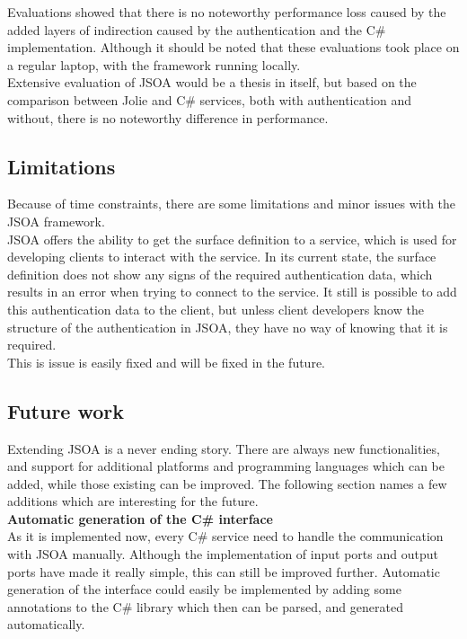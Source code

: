 \documentclass[12pt,a4paper]{article}
\begin{document}
Evaluations showed that there is no noteworthy performance loss caused by the added layers of indirection caused by the authentication and the C\# implementation. Although it should be noted that these evaluations took place on a regular laptop, with the framework running locally.\\
Extensive evaluation of JSOA would be a thesis in itself, but based on the comparison between Jolie and C\# services, both with authentication and without, there is no noteworthy difference in performance.

\subsection{Limitations}\label{subsec:Limitations}
Because of time constraints, there are some limitations and minor issues with the JSOA framework.\\
JSOA offers the ability to get the surface definition to a service, which is used for developing clients to interact with the service. In its current state, the surface definition does not show any signs of the required authentication data, which results in an error when trying to connect to the service. It still is possible to add this authentication data to the client, but unless client developers know the structure of the authentication in JSOA, they have no way of knowing that it is required.\\
This is issue is easily fixed and will be fixed in the future.

\subsection{Future work}\label{subsec:FutureWork}
Extending JSOA is a never ending story. There are always new functionalities, and support for additional platforms and programming languages which can be added, while those existing can be improved. The following section names a few additions which are interesting for the future.\\

\textbf{Automatic generation of the C\# interface} \\
As it is implemented now, every C\# service need to handle the communication with JSOA manually. Although the implementation of input ports and output ports have made it really simple, this can still be improved further. Automatic generation of the interface could easily be implemented by adding some annotations to the C\# library which then can be parsed, and generated automatically.\\
\end{document}
